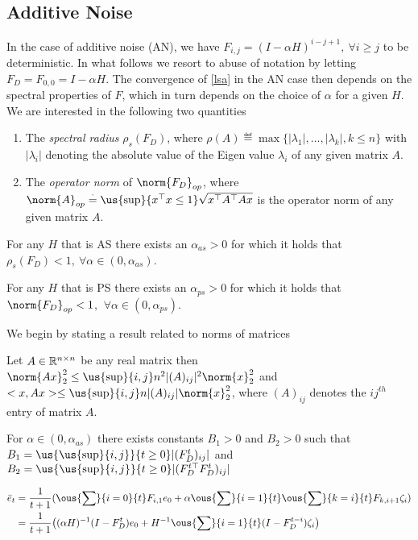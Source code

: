 \subsection{Additive Noise}
In the case of additive noise (AN), we have $F_{i,j}= (I-\alpha H)^{i-j+1},~\forall i\geq j$ to be deterministic. In what follows we resort to abuse of notation by letting $F_D=F_{0,0}=I-\alpha H$. The convergence of \eqref{lsa} in the AN case then depends on the spectral properties of $F$, which in turn depends on the choice of $\alpha$ for a given $H$. We are interested in the following two quantities
\begin{enumerate}
\item The \emph{spectral radius} $\rho_s(F_D)$, where $\rho(A)\eqdef\max\{|\lambda_1|,\ldots,|\lambda_k|,k\leq n\}$ with $|\lambda_i|$ denoting the absolute value of the Eigen value $\lambda_i$ of any given matrix $A$.
\item The \emph{operator norm} of $\norm{F_D}_{op}$, where $\norm{A}_{op}\eqdef\us{\sup}{x^\top x\leq 1}\sqrt{x^\top A^\top A x}$ is the operator norm of any given matrix $A$.
\end{enumerate}
\begin{lemma}\label{addstep}
For any $H$ that is AS there exists an $\alpha_{as}>0$ for which it holds that $\rho_{s}(F_D)<1,~\forall \alpha\in (0,\alpha_{as})$.
\end{lemma}
\begin{lemma}\label{addstep}
For any $H$ that is PS there exists an $\alpha_{ps}>0$ for which it holds that $\norm{F_D}_{op}<1$, $~\forall \alpha\in (0,\alpha_{ps})$.
\end{lemma}
We begin by stating a result related to norms of matrices
\begin{lemma}
Let $A\in \mathbb{R}^{n\times n}$ be any real matrix then $\norm{Ax}^2_2\leq \us{\sup}{i,j}n^2|(A)_{ij}|^2\norm{x}^2_2$ and $<x,Ax>\leq \us{\sup}{i,j}n|(A)_{ij}|\norm{x}^2_2$, where $(A)_{ij}$ denotes the $ij^{th}$ entry of matrix $A$.
\end{lemma}
\begin{lemma}
For $\alpha \in (0,\alpha_{as})$ there exists constants $B_1>0$ and $B_2>0$ such that $B_1=\us{\us{\sup}{i,j}}{t\geq 0}|(F_D^t)_{ij}|$ and $B_2=\us{\us{\sup}{i,j}}{t\geq 0}|(F_D^{t\top}F_D^t)_{ij}|$
\end{lemma}
\begin{align}
\eb_t&=\frac{1}{t+1}(\ous{\sum}{i=0}{t} F_{i,1} e_0+ \alpha\ous{\sum}{i=1}{t} \ous{\sum}{k=i}{t} F_{k,i+1}  \zeta_i )\nn\\
&=\frac{1}{t+1}\big((\alpha H)^{-1}(I-F_D^t)e_0+ H^{-1}\ous{\sum}{i=1}{t}(I-F_D^{t-i}) \zeta_i\big)
\end{align}

